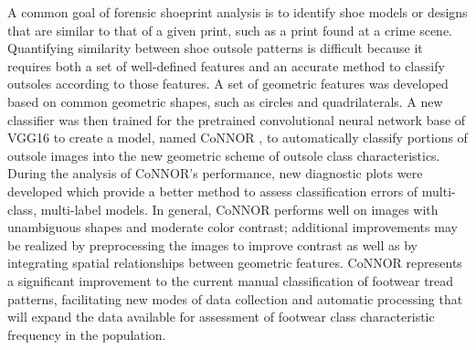 
A common goal of forensic shoeprint analysis is to identify shoe models or designs that are similar to that of a given print, such as a print found at a crime scene. Quantifying similarity between shoe outsole patterns is difficult because it requires both a set of well-defined features and an accurate method to classify outsoles according to those features. A set of geometric features was developed based on common geometric shapes, such as circles and quadrilaterals. A new classifier was then trained for the pretrained convolutional neural network base of VGG16 to create a model, named CoNNOR , to automatically classify portions of outsole images into the new geometric scheme of outsole class characteristics. During the analysis of CoNNOR's performance, new diagnostic plots were developed which provide a better method to assess classification errors of multi-class, multi-label models. In general, CoNNOR performs well on images with unambiguous shapes and moderate color contrast; additional improvements may be realized by preprocessing the images to improve contrast as well as by integrating spatial relationships between geometric features. CoNNOR represents a significant improvement to the current manual classification of footwear tread patterns, facilitating new modes of data collection and automatic processing that will expand the data available for assessment of footwear class characteristic frequency in the population.
